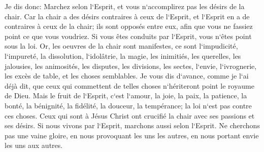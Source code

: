 \verse Je dis donc: Marchez selon l`Esprit, et vous n`accomplirez pas les désirs de la chair. 
\verse Car la chair a des désirs contraires à ceux de l`Esprit, et l`Esprit en a de contraires à ceux de la chair; ils sont opposés entre eux, afin que vous ne fassiez point ce que vous voudriez. 
\verse Si vous êtes conduits par l`Esprit, vous n`êtes point sous la loi. 
\verse Or, les oeuvres de la chair sont manifestes, ce sont l`impudicité, l`impureté, la dissolution, 
\verse l`idolâtrie, la magie, les inimitiés, les querelles, les jalousies, les animosités, les disputes, les divisions, les sectes, 
\verse l`envie, l`ivrognerie, les excès de table, et les choses semblables. Je vous dis d`avance, comme je l`ai déjà dit, que ceux qui commettent de telles choses n`hériteront point le royaume de Dieu. 
\verse Mais le fruit de l`Esprit, c`est l`amour, la joie, la paix, la patience, la bonté, la bénignité, la fidélité, la douceur, la tempérance; 
\verse la loi n`est pas contre ces choses. 
\verse Ceux qui sont à Jésus Christ ont crucifié la chair avec ses passions et ses désirs. 
\verse Si nous vivons par l`Esprit, marchons aussi selon l`Esprit. 
\verse Ne cherchons pas une vaine gloire, en nous provoquant les uns les autres, en nous portant envie les uns aux autres. 

